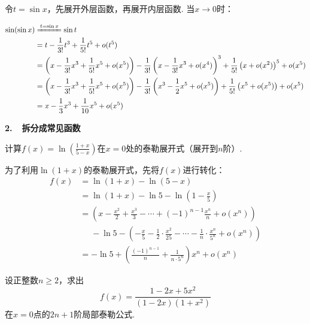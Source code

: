 \begin{solution}
令$t=\sin x$，先展开外层函数，再展开内层函数. 当$x \to 0$时：

\begin{align*}
        \sin (\sin x)
        &\xlongequal{ t= \sin x} \sin t \\
        &= t - \frac{1}{3!} t^3 + \frac{1}{5!} t^5 + o(t^5) \\
        &= \left( x - \frac{1}{3!} x^3 + \frac{1}{5!} x^5 + o(x^5) \right)
        -\frac{1}{3!} \left(  x - \frac{1}{3!} x^3 + o(x^4) \right)^{3}
        +\frac{1}{5!} \left( x + o(x^2) \right)^{5} + o(x^5)\\
        &= \left( x - \frac{1}{3!} x^3 + \frac{1}{5!} x^5 + o(x^5) \right)
        -\frac{1}{3!} \left( x^3 - \frac{1}{2} x^{5} + o(x^5) \right)
        +\frac{1}{5!} \left(x^5 + o(x^5) \right) + o(x^5) \\
        &= x - \frac{1}{3} x^3 + \frac{1}{10} x^5 +o(x^5)
\end{align*}
\end{solution}

\clearpage

\textbf{2.~~拆分成常见函数}

\begin{example}
\label{ex:ch04-03}
计算$f(x) = \ln \left( \frac{1+x}{5-x} \right)$在$x=0$处的泰勒展开式（展开到$n$阶）.
\end{example}

\begin{solution}
为了利用$\ln (1+x)$的泰勒展开式，先将$f(x)$进行转化：
\begin{equation}
    \begin{aligned}
        f(x) &= \ln (1+x) -\ln (5-x) \\
        &= \ln (1+x) -\ln5 - \ln\left(1-\frac{x}{5} \right) \\
        &= \left(x - \frac{x^2}{2} + \frac{x^3}{3} - \cdots +(-1)^{n-1} \frac{x^n}{n} + o(x^n)\right) \\
        &~~~~~~ -\ln 5 - \left( -\frac{x}{5} - \frac{1}{2} \cdot \frac{x^2}{25} - \cdots - \frac{1}{n}\cdot \frac{x^n}{5^n} + o(x^n)  \right) \\
        &= -\ln 5 + \left( \frac{(-1)^{n-1}}{n} + \frac{1}{n \cdot 5^n}\right)x^n + o(x^n)
        \nonumber
    \end{aligned}
\end{equation}
\end{solution}

\begin{example}[2021]
\label{ex:ch04-04}
设正整数$n \ge 2$，求出
$$
f(x) = \frac{1 - 2x +5x^2}{(1-2x)(1+x^2)}
$$
在$x=0$点的$2n+1$阶局部泰勒公式.
\end{example}

